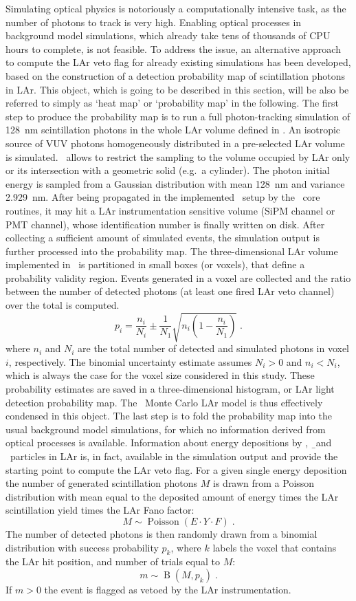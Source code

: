 Simulating optical physics is notoriously a computationally intensive task, as the number
of photons to track is very high. Enabling optical processes in background model
simulations, which already take tens of thousands of CPU hours to complete, is not
feasible. To address the issue, an alternative approach to compute the LAr veto flag for
already existing simulations has been developed, based on the construction of a detection
probability map of scintillation photons in LAr. This object, which is going to be
described in this section, will be also be referred to simply as `heat map' or
`probability map' in the following.
\newpar
The first step to produce the probability map is to run a full photon-tracking simulation
of 128~nm scintillation photons in the whole LAr volume defined in \mage. An isotropic
source of VUV photons homogeneously distributed in a pre-selected LAr volume is simulated.
\mage\ allows to restrict the sampling to the volume occupied by LAr only or its
intersection with a geometric solid (e.g.~a cylinder). The photon initial energy is
sampled from a Gaussian distribution with mean 128~nm and variance 2.929~nm. After being
propagated in the implemented \gerda\ setup by the \geant\ core routines, it may hit a
LAr instrumentation sensitive volume (SiPM channel or PMT channel), whose identification
number is finally written on disk. After collecting a sufficient amount of simulated
events, the simulation output is further processed into the probability map. The
three-dimensional LAr volume implemented in \mage\ is partitioned in small boxes (or voxels),
that define a probability validity region. Events generated in a voxel are collected and
the ratio between the number of detected photons (at least one fired LAr veto channel)
over the total is computed.
\[
  p_i = \frac{n_i}{N_i} \pm \frac{1}{N_1}\sqrt{n_i \left(1 - \frac{n_i}{N_1} \right)} \;.
\]
where $n_i$ and $N_i$ are the total number of detected and simulated photons in voxel $i$,
respectively. The binomial uncertainty estimate assumes $N_i>0$ and $n_i<N_i$, which is
always the case for the voxel size considered in this study.  These probability estimates
are saved in a three-dimensional histogram, or LAr light detection probability map. The
\gerda\ Monte Carlo LAr model is thus effectively condensed in this object.
\newpar
The last step is to fold the probability map into the usual background model simulations,
for which no information derived from optical processes is available. Information about
energy depositions by \g, \b\ and \a\ particles in LAr is, in fact, available in the
simulation output and provide the starting point to compute the LAr veto flag. For a given
single energy deposition the number of generated scintillation photons $M$ is drawn from a
Poisson distribution with mean equal to the deposited amount of energy times the LAr
scintillation yield times the LAr Fano factor:
\[
  M \sim \operatorname{Poisson}(E \cdot Y \cdot F) \;.
\]
The number of detected photons is then randomly drawn from a binomial distribution with
success probability $p_k$, where $k$ labels the voxel that contains the LAr hit position,
and number of trials equal to $M$:
\[
  m \sim \operatorname{B}(M, p_k) \;.
\]
If $m>0$ the event is flagged as vetoed by the LAr instrumentation.

